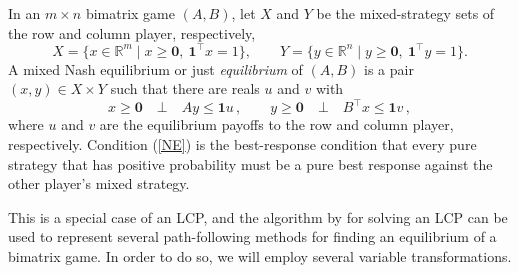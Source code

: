 \documentclass[a4paper,12pt]{article}  %
\theoremstyle{definition}
\def\reals{{\mathbb R}}
\newcommand{\T}{^{\top}}
\newcommand{\0}{{\mathbf0}}
\newcommand{\1}{{\mathbf1}}
\begin{document}
In an $m\times n$ bimatrix game $(A,B)$, let 
$X$ and $Y$ be the mixed-strategy sets of the row and column
player, respectively,
\begin{equation}
\label{XY}
X=\{x\in\reals^m\mid x\ge\0,~\1\T x=1\},
\qquad
Y=\{y\in\reals^n\mid y\ge\0,~\1\T y=1\}. 
\end{equation}
A mixed Nash equilibrium or just \textit{equilibrium} of
$(A,B)$ is a pair $(x,y)\in X\times Y$ such that there are
reals $u$ and $v$ with
\begin{equation}
\label{NE}
x\ge\0
\quad\bot\quad 
Ay\le\1 u\,,\qquad
y\ge\0
\quad\bot\quad 
B\T x\le\1 v\,,
\end{equation}
where $u$ and $v$ are the equilibrium payoffs to the row and
column player, respectively.
Condition (\ref{NE}) is the best-response condition that
every pure strategy that has positive probability must be a
pure best response against the other player's mixed
strategy.

This is a special case of an LCP, and the algorithm 
by \citet{Lemke1965} for solving an LCP can be used to
represent several path-following methods for finding an
equilibrium of a bimatrix game.
In order to do so, we will employ several variable
transformations.
\end{document}

